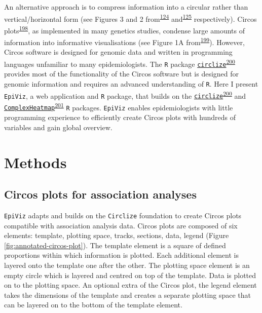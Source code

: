 \documentclass[11pt,twoside]{bristolthesis}
\begin{document}
An alternative approach is to compress information into a circular rather than vertical/horizontal form (see Figures 3 and 2 from\textsuperscript{\protect\hyperlink{ref-Shin2014}{124}} and\textsuperscript{\protect\hyperlink{ref-Kettunen2016}{125}} respectively). Circos plots\textsuperscript{\protect\hyperlink{ref-Krzywinski2009}{198}}, as implemented in many genetics studies, condense large amounts of information into informative visualisations (see Figure 1A from\textsuperscript{\protect\hyperlink{ref-Saben2014}{199}}). However, Circos software is designed for genomic data and written in programming languages unfamiliar to many epidemiologists. The \texttt{R} package \href{https://jokergoo.github.io/circlize_book/book/index.html}{\texttt{circlize}}\textsuperscript{\protect\hyperlink{ref-Gu2014}{200}} provides most of the functionality of the Circos software but is designed for genomic information and requires an advanced understanding of \texttt{R}. Here I present \texttt{EpiViz}, a web application and \texttt{R} package, that builds on the \href{https://jokergoo.github.io/circlize_book/book/index.html}{\texttt{circlize}}\textsuperscript{\protect\hyperlink{ref-Gu2014}{200}} and \href{https://jokergoo.github.io/ComplexHeatmap-reference/book/}{\texttt{ComplexHeatmap}}\textsuperscript{\protect\hyperlink{ref-Gu2016}{201}} \texttt{R} packages. \texttt{EpiViz} enables epidemiologists with little programming experience to efficiently create Circos plots with hundreds of variables and gain global overview.

\hypertarget{methods}{%
\section{Methods}\label{methods}}

\hypertarget{circos-plots-for-association-analyses}{%
\subsection{Circos plots for association analyses}\label{circos-plots-for-association-analyses}}

\texttt{EpiViz} adapts and builds on the \texttt{Circlize} foundation to create Circos plots compatible with association analysis data. Circos plots are composed of six elements: template, plotting space, tracks, sections, data, legend (Figure \ref{fig:annotated-circos-plot}). The template element is a square of defined proportions within which information is plotted. Each additional element is layered onto the template one after the other. The plotting space element is an empty circle which is layered and centred on top of the template. Data is plotted on to the plotting space. An optional extra of the Circos plot, the legend element takes the dimensions of the template and creates a separate plotting space that can be layered on to the bottom of the template element.
\end{document}
